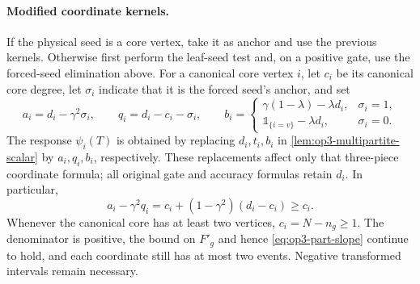 \paragraph{Modified coordinate kernels.}
If the physical seed is a core vertex, take it as anchor and use the
previous kernels. Otherwise first perform the leaf-seed test and, on a
positive gate, use the forced-seed elimination above. For a canonical core
vertex $i$, let $c_i$ be its canonical core degree, let $\sigma_i$ indicate
that it is the forced seed's anchor, and set
\[
 a_i=d_i-\gamma^2\sigma_i,\qquad
 q_i=d_i-c_i-\sigma_i,\qquad
 b_i=
 \begin{cases}
 \gamma(1-\lambda)-\lambda d_i,&\sigma_i=1,\\
 \mathbb 1_{\{i=v\}}-\lambda d_i,&\sigma_i=0.
 \end{cases}
\]
The response $\psi_i(T)$ is obtained by replacing $d_i,t_i,b_i$ in
\cref{lem:op3-multipartite-scalar} by $a_i,q_i,b_i$, respectively.
These replacements affect only that three-piece coordinate formula;
all original gate and accuracy formulas retain $d_i$. In particular,
\begin{equation}
 a_i-\gamma^2q_i
 =c_i+(1-\gamma^2)(d_i-c_i)\geq c_i.
 \label{eq:op3-canonical-kernel-slope}
\end{equation}
Whenever the canonical core has at least two vertices, $c_i=N-n_g\geq1$.
The denominator is positive, the bound on $F'_g$ and hence
\cref{eq:op3-part-slope} continue to hold, and each coordinate still
has at most two events. Negative transformed intervals remain necessary.

